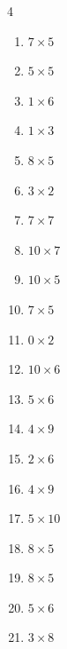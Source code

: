\begin{multicols}{4}
\begin{enumerate}
  \item $7\times 5$
        \phantom{$=35$}

  \item $5\times 5$
        \phantom{$=25$}

  \item $1\times 6$
        \phantom{$=6$}

  \item $1\times 3$
        \phantom{$=3$}

  \item $8\times 5$
        \phantom{$=40$}

  \item $3\times 2$
        \phantom{$=6$}

  \item $7\times 7$
        \phantom{$=49$}

  \item $10\times 7$
        \phantom{$=70$}

  \item $10\times 5$
        \phantom{$=50$}

  \item $7\times 5$
        \phantom{$=35$}

  \item $0\times 2$
        \phantom{$=0$}

  \item $10\times 6$
        \phantom{$=60$}

  \item $5\times 6$
        \phantom{$=30$}

  \item $4\times 9$
        \phantom{$=36$}

  \item $2\times 6$
        \phantom{$=12$}

  \item $4\times 9$
        \phantom{$=36$}

  \item $5\times 10$
        \phantom{$=50$}

  \item $8\times 5$
        \phantom{$=40$}

  \item $8\times 5$
        \phantom{$=40$}

  \item $5\times 6$
        \phantom{$=30$}

  \item $3\times 8$
        \phantom{$=24$}


\end{enumerate}
\end{multicols}
